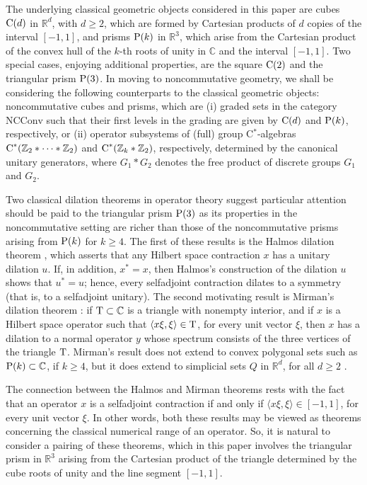 \documentclass{amsart}
\theoremstyle{definition}
\theoremstyle{remark}
\newcommand\cstar{{\textrm C}^*}                              %
\numberwithin{equation}{section}
\begin{document}
The underlying classical geometric objects considered in this paper are cubes $\mbox{\textrm C}(d)$ in $\mathbb R^d$, with $d\geq 2$, which are formed by Cartesian products of $d$ copies of the interval $[-1,1]$, and prisms $\mbox{\textrm P}(k)$ in $\mathbb R^3$, which arise from the Cartesian product of the convex hull of the $k$-th roots of unity in $\mathbb C$ and the interval $[-1,1]$. Two special cases, enjoying additional properties, are the square $\mbox{\textrm C}(2)$ and the triangular prism $\mbox{\textrm P}(3)$. In moving to noncommutative geometry, we shall be considering the following counterparts to the classical geometric objects: noncommutative cubes and prisms, 
which are (i) graded sets in the category ${\textrm{NCConv}}$ such that their first levels in the grading 
are given by $\mbox{\textrm C}(d)$ and $\mbox{\textrm P}(k)$, respectively, or (ii) operator subsystems of (full) group C$^*$-algebras $\cstar(\mathbb Z_2*\cdots*\mathbb Z_2)$ and $\cstar(\mathbb Z_k * \mathbb Z_2)$, respectively, determined by the canonical unitary generators, where $G_1*G_2$ denotes the free product of discrete groups $G_1$ and $G_2$. 

Two classical dilation theorems in operator theory suggest particular attention should be paid to the triangular prism $\mbox{\textrm P}(3)$ as its properties in the noncommutative setting are richer than those of the noncommutative prisms arising from $\mbox{\textrm P}(k)$ for $k\geq 4$. 
The first of these results is the Halmos dilation theorem \cite{halmos1950}, which asserts that any Hilbert space contraction $x$ has a unitary dilation $u$. If, in addition, $x^*=x$, then Halmos's construction of the dilation $u$ shows that $u^*=u$; hence, every selfadjoint contraction dilates to a symmetry (that is, to a selfadjoint unitary).
The second motivating result is Mirman's dilation theorem \cite{mirman1968}: 
if $\mbox{\textrm T}\subset\mathbb C$ is a triangle with nonempty interior, and
if $x$ is a Hilbert space operator such that $\langle x\xi,\xi\rangle\in \mbox{\textrm T}$, for every unit vector $\xi$, then $x$ has a dilation to a normal operator $y$ whose spectrum consists of the three vertices of the triangle $\mbox{\textrm T}$. 
Mirman's result does not extend to convex polygonal sets such as $\mbox{\textrm P}(k)\subset\mathbb C$, if $k\geq4$, but it does extend to simplicial sets $Q$ in $\mathbb R^d$, for all $d\geq2$ \cite{binding--farenick--li1995}.

The connection between the Halmos and Mirman theorems rests with the fact that an operator $x$ is a selfadjoint contraction if and only if $\langle x\xi,\xi\rangle\in[-1,1]$, for every unit vector $\xi$. In other words, both these results may be viewed as theorems concerning the classical numerical range of an operator. So, it is natural to consider a pairing of these theorems, which in this paper involves the triangular prism in $\mathbb R^3$ arising from the Cartesian product of the triangle determined by the cube roots of unity and the line segment $[-1,1]$.
\end{document}
